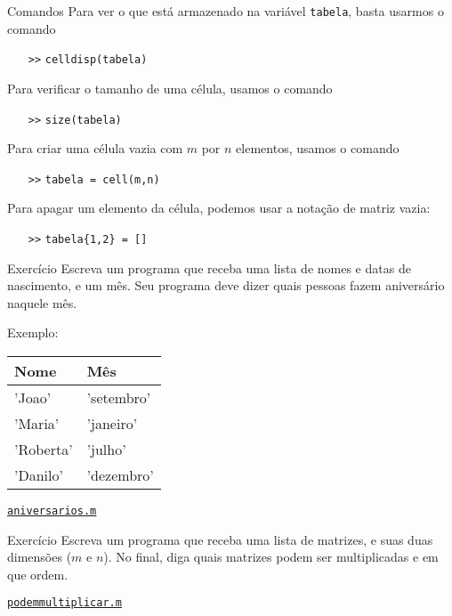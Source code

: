 \documentclass[hyperref={pdfpagelabels=false}]{beamer}
\begin{document}
\begin{frame}{Comandos}
   Para ver o que está armazenado na variável \texttt{tabela}, basta usarmos o comando
   \begin{itemize}
      \item[\texttt{>>}] \texttt{celldisp(tabela)}
   \end{itemize}
   Para verificar o tamanho de uma célula, usamos o comando
   \begin{itemize}
      \item[\texttt{>>}] \texttt{size(tabela)}
   \end{itemize}
   Para criar uma célula vazia com $m$ por $n$ elementos, usamos o comando
   \begin{itemize}
      \item[\texttt{>>}] \texttt{tabela = cell(m,n)}
   \end{itemize}
   Para apagar um elemento da célula, podemos usar a notação de matriz vazia:
   \begin{itemize}
      \item[\texttt{>>}] \texttt{tabela\{1,2\} = []}
   \end{itemize}
\end{frame}

\begin{frame}{Exercício}
   Escreva um programa que receba uma lista de nomes e datas de nascimento, e um mês. Seu programa deve dizer quais pessoas fazem aniversário naquele mês.

   Exemplo:\\
   \begin{center}
   \begin{tabular}{l l}
      Nome & Mês\\\toprule
      'Joao' & 'setembro'\\
      'Maria' & 'janeiro'\\
      'Roberta' & 'julho'\\
      'Danilo' & 'dezembro'
   \end{tabular}
   \end{center}
   \vfill
   \begin{center}
     \href{listings/aniversarios.m}{\underline{\texttt{aniversarios.m}}}
   \end{center}
\end{frame}

\begin{frame}{Exercício}
   Escreva um programa que receba uma lista de matrizes, e suas duas dimensões ($m$ e $n$). No final, diga quais matrizes podem ser multiplicadas e em que ordem.
   \vfill
   \begin{center}
     \href{listings/podemmultiplicar.m}{\underline{\texttt{podemmultiplicar.m}}}
   \end{center}
\end{frame}
\end{document}
